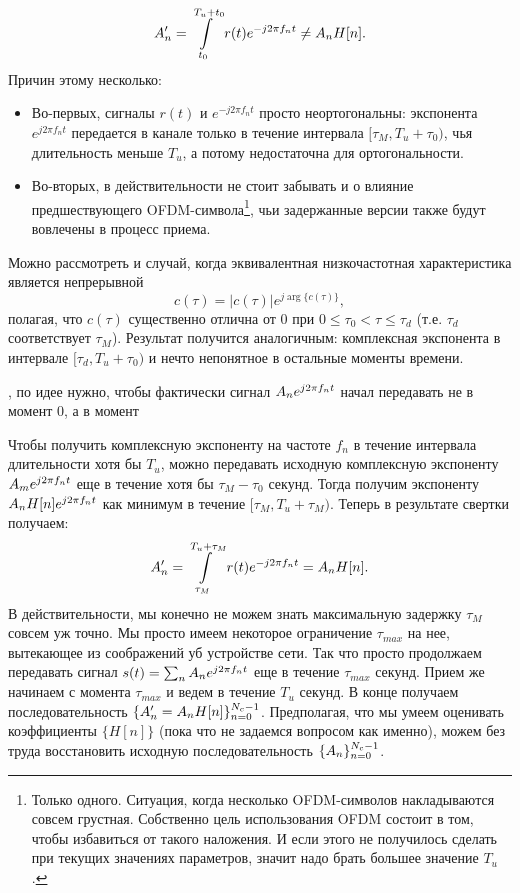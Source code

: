 \documentclass{book}
\numberwithin{theorem}{chapter}
\numberwithin{statement}{chapter}
\numberwithin{lemma}{chapter}
\theoremstyle{definition}
\numberwithin{task}{chapter}
\theoremstyle{remark}
\numberwithin{example}{chapter}
\theoremstyle{definition}
\numberwithin{definition}{chapter}
\theoremstyle{remark}
\theoremstyle{remark}
\numberwithin{lyrics}{section}
\begin{document}
\begin{equation}
\notag
A_n' = \int\limits_{t_0}^{T_u + t_0} r(t) e^{-j 2\pi f_n t} \neq A_n H[n].
\end{equation}
Причин этому несколько:
\begin{itemize}
\item Во-первых, сигналы $r(t)$ и $e^{-j 2\pi f_n t}$ просто неортогональны: экспонента $e^{j 2\pi f_n t}$ передается в канале только в течение интервала $[\tau_M, T_u + \tau_0)$, чья длительность меньше $T_u$, а потому недостаточна для ортогональности.
\item Во-вторых, в действительности не стоит забывать и о влияние предшествующего OFDM-символа\footnote{Только одного. Ситуация, когда несколько OFDM-символов накладываются совсем грустная. Собственно цель использования OFDM состоит в том, чтобы избавиться от такого наложения. И если этого не получилось сделать при текущих значениях параметров, значит надо брать большее значение $T_u$.}, чьи задержанные версии также будут вовлечены в процесс приема.
\end{itemize}
Можно рассмотреть и случай, когда эквивалентная низкочастотная характеристика является непрерывной $$c(\tau) = |c(\tau)|e^{j \arg\{c(\tau)\}},$$
полагая, что $c(\tau)$ существенно отлична от $0$ при $0 \le \tau_0 < \tau \le \tau_d$ (т.е. $\tau_d$ соответствует $\tau_M$). Результат получится аналогичным: комплексная экспонента в интервале $[\tau_d, T_u + \tau_0)$ и нечто непонятное в остальные моменты времени.

, по идее нужно, чтобы фактически сигнал $A_n e^{j 2\pi f_n t}$ начал передавать не в момент 0, а в момент $ $

Чтобы получить комплексную экспоненту на частоте $f_n$ в течение интервала длительности хотя бы $T_u$, можно передавать исходную комплексную экспоненту $A_m e^{j 2\pi f_n t}$ еще в течение хотя бы $\tau_M - \tau_0$ секунд. Тогда получим экспоненту $A_n H[n] e^{j 2\pi f_n t}$ как минимум в течение $[\tau_M, T_u + \tau_M)$. Теперь в результате свертки получаем:
\begin{equation}
\notag
A_n' = \int\limits_{\tau_M}^{T_u + \tau_M} r(t) e^{-j2\pi f_n t} = A_n H[n].
\end{equation}
В действительности, мы конечно не можем знать максимальную задержку $\tau_M$ совсем уж точно. Мы просто имеем некоторое ограничение $\tau_{max}$ на нее, вытекающее из соображений уб устройстве сети. Так что просто продолжаем передавать сигнал $s(t) = \sum_n A_n e^{j2\pi f_n t}$ еще в течение $\tau_{max}$ секунд. Прием же начинаем с момента $\tau_{max}$ и ведем в течение $T_u$ секунд. В конце получаем последовательность $\{A_n' = A_n H[n]\}_{n = 0}^{N_c - 1}$. Предполагая, что мы умеем оценивать коэффициенты $\{H[n]\}$ (пока что не задаемся вопросом как именно), можем без труда восстановить исходную последовательность $\{A_n\}_{n = 0}^{N_c - 1}$.
\end{document}
